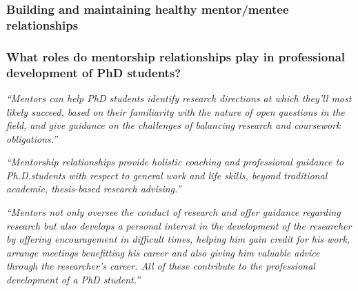 \documentclass[12pt]{beamer}
\newcommand\ans[1]{{\it ``#1''}}
\newcommand\gap{\vspace{5mm}}
\begin{document}



\begin{frame}
   \frametitle{Building and maintaining healthy mentor/mentee relationships}
\end{frame}

\begin{frame} %
  
\frametitle{What roles do mentorship relationships play in professional development of PhD students?} 

\ans{Mentors can help PhD students identify research directions at which they’ll most likely succeed, based on their familiarity with the nature of open questions in the field, and give guidance on the challenges of balancing research and coursework obligations.}

\gap

\ans{Mentorship relationships provide holistic coaching and professional guidance to Ph.D.students with respect to general work and life skills, beyond traditional academic, thesis-based research advising.}


\end{frame}

\begin{frame}
  
\ans{Mentors not only oversee the conduct of research and offer guidance regarding research but also develops a personal interest in the development of the researcher by offering encouragement in difficult times, helping him gain credit for his work, arrange meetings benefitting  his  career  and  also  giving  him  valuable  advice  through  the  researcher’s career.  All of these contribute to the professional development of a PhD student.}
  
  




\end{frame}
\end{document}
